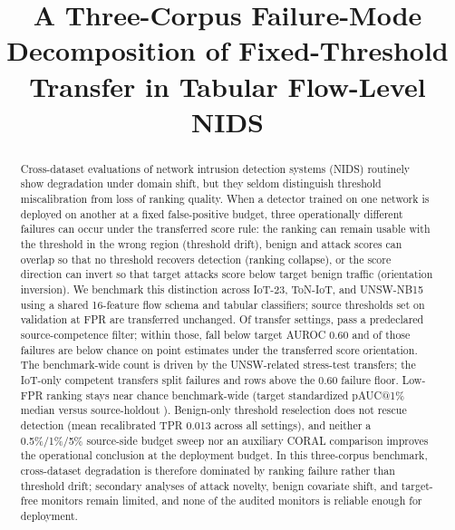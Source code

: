 \documentclass[10pt,conference]{IEEEtran}
\title{A Three-Corpus Failure-Mode Decomposition of Fixed-Threshold Transfer in Tabular Flow-Level NIDS}
\author{
\IEEEauthorblockN{Mustafa Ipekbayrak}
\IEEEauthorblockA{\textit{Institute of Graduate Studies} \\
\textit{Istanbul University-Cerrahpa\c{s}a} \\
Istanbul, T\"urkiye}
\and
\IEEEauthorblockN{G{\"u}ls{\"u}m Zeynep G{\"u}rka\c{s}-Ayd{\i}n}
\IEEEauthorblockA{\textit{Istanbul University-Cerrahpa\c{s}a} \\
Istanbul, T\"urkiye}
}
\begin{document}
\maketitle

\begin{abstract}
Cross-dataset evaluations of network intrusion detection systems (NIDS) routinely show degradation under domain shift, but they seldom distinguish threshold miscalibration from loss of ranking quality. When a detector trained on one network is deployed on another at a fixed false-positive budget, three operationally different failures can occur under the transferred score rule: the ranking can remain usable with the threshold in the wrong region (threshold drift), benign and attack scores can overlap so that no threshold recovers detection (ranking collapse), or the score direction can invert so that target attacks score below target benign traffic (orientation inversion). We benchmark this distinction across IoT-23, ToN-IoT, and UNSW-NB15 using a shared 16-feature flow schema and \ModelCount{} tabular classifiers; source thresholds set on validation at \FrozenFprTarget{} FPR are transferred unchanged. Of \NaturalSettingCount{} transfer settings, \CompetentSettingCount{} pass a predeclared source-competence filter; within those, \CompetentRankingFailureCount{} fall below target AUROC 0.60 and \CompetentInversionCount{} of those failures are below chance on point estimates under the transferred score orientation. The benchmark-wide count is driven by the \CompetentUnswStressTestSettingCount{} UNSW-related stress-test transfers; the \CompetentIotOnlySettingCount{} IoT-only competent transfers split \CompetentIotOnlyRankingFailureCount{} failures and \CompetentIotOnlyNonCollapsedCount{} rows above the 0.60 failure floor. Low-FPR ranking stays near chance benchmark-wide (target standardized pAUC@1\% median \CompetentTargetPaucMedian{} versus source-holdout \CompetentSourcePaucMedian{}). Benign-only threshold reselection does not rescue detection (mean recalibrated TPR 0.013 across all \NaturalSettingCount{} settings), and neither a 0.5\%/1\%/5\% source-side budget sweep nor an auxiliary CORAL comparison improves the operational conclusion at the deployment budget. In this three-corpus benchmark, cross-dataset degradation is therefore dominated by ranking failure rather than threshold drift; secondary analyses of attack novelty, benign covariate shift, and target-free monitors remain limited, and none of the audited monitors is reliable enough for deployment.
\end{abstract}
\end{document}
